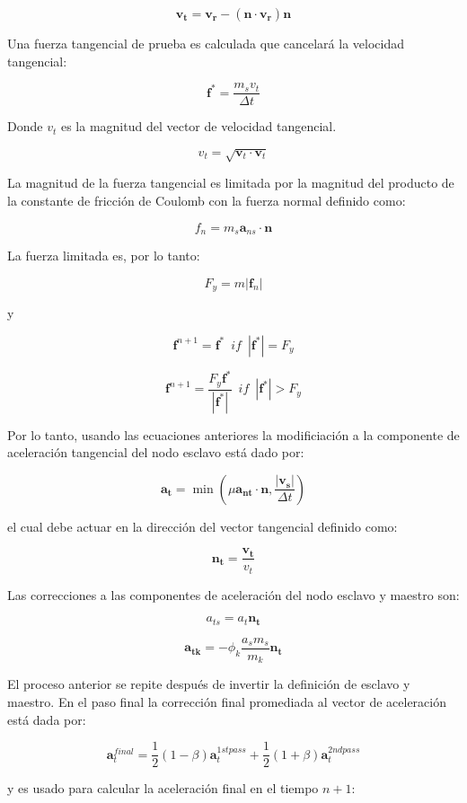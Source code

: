 $$
\mathbf{v_t} = \mathbf{v_r} - (\mathbf{n} \cdot \mathbf{v_r}) \mathbf{n}
$$

Una fuerza tangencial de prueba es calculada que cancelará la velocidad tangencial:

$$
\mathbf{f^{\ast}} = \frac{m_s v_t}{\Delta t}
$$

Donde $v_t$ es la magnitud del vector de velocidad tangencial.

$$
v_t = \sqrt{\mathbf{v}_t \cdot \mathbf{v}_t}
$$

La magnitud de la fuerza tangencial es limitada por la magnitud del producto de la constante de fricción 
de Coulomb con la fuerza normal definido como:

$$
f_n = m_s \mathbf{a}_{ns} \cdot \mathbf{n}
$$

La fuerza limitada es, por lo tanto:

$$
F_y = m |\mathbf{f}_n|
$$

y 

$$
\mathbf{f}^{n+1} = \mathbf{f^{\ast}} \,\,\, if \,\,\, |\mathbf{f^{\ast}}| = F_y
$$

$$
\mathbf{f}^{n+1} = \frac{F_y \mathbf{f^{\ast}}}{|\mathbf{f^{\ast}}|} \,\,\, if \,\,\, |\mathbf{f^{\ast}}| > F_y
$$

Por lo tanto, usando las ecuaciones anteriores la modificiación a la componente de  aceleración tangencial 
del nodo esclavo está dado por:

$$
\mathbf{a_t} = \min\left( \mu \mathbf{a_{nt}} \cdot \mathbf{n} , \frac{|\mathbf{v_s}|}{\Delta t} \right)
$$

el cual debe actuar en la dirección del vector tangencial definido como:

$$
\mathbf{n_t} = \frac{\mathbf{v_t}}{v_t}
$$

Las correcciones a las componentes de aceleración del nodo esclavo y maestro son: 

$$
a_{ts} = a_{t} \mathbf{n_t}
$$

$$
\mathbf{a_{tk}} = - \phi_k \frac{a_s m_s}{m_k} \mathbf{n_t}
$$

El proceso anterior se repite después de invertir la definición de esclavo y maestro. En el 
paso final la corrección final promediada al vector de aceleración está dada por:

$$
\mathbf{a}_t^{final} = \frac{1}{2} \left( 1-\beta \right) \mathbf{a}_t^{1st pass}  + 
\frac{1}{2} \left( 1 + \beta \right) \mathbf{a}_t^{2nd pass} 
$$

y es usado para calcular la aceleración final en el tiempo $n+1$: 

